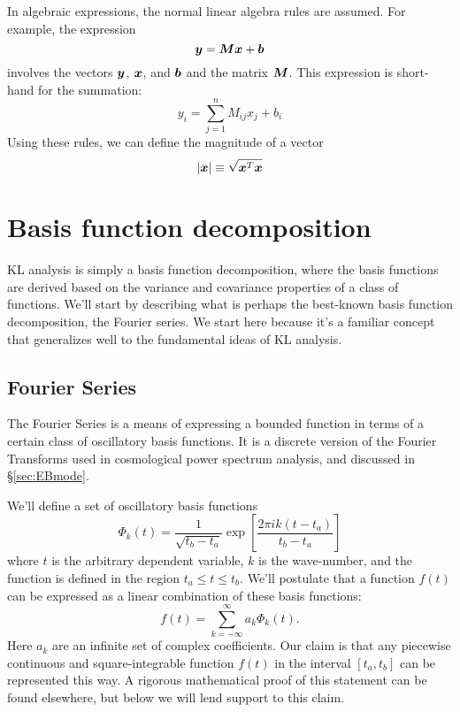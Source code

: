 In algebraic expressions, the normal linear algebra rules are assumed.
For example, the expression 
\begin{equation}
  \boldsymbol{y} = \boldsymbol{M}\boldsymbol{x} + \boldsymbol{b}
\end{equation}
involves the vectors $\boldsymbol{y}$, $\boldsymbol{x}$, and $\boldsymbol{b}$ and the
matrix $\boldsymbol{M}$.  This expression is short-hand for the summation:
\begin{equation}
  y_i = \sum_{j=1}^{n} M_{ij} x_j + b_i
\end{equation}
Using these rules, we can define the magnitude of a vector
\begin{equation}
  |\boldsymbol{x}| \equiv \sqrt{\boldsymbol{x}^T \boldsymbol{x}}
\end{equation}

\section{Basis function decomposition}
KL analysis is simply a basis function decomposition, where the basis
functions are derived based on the variance and covariance properties
of a class of functions.  We'll start by describing what is perhaps the
best-known basis function decomposition, the Fourier series.
We start here because it's a familiar concept that generalizes well to
the fundamental ideas of KL analysis.

\subsection{Fourier Series}
The Fourier Series is a means of expressing a bounded function in terms
of a certain class of oscillatory basis functions.  It is a discrete version
of the Fourier Transforms used in cosmological power spectrum analysis, and
discussed in \S\ref{sec:EBmode}.

We'll define a set of oscillatory basis functions 
\begin{equation}
  \label{eq:fourier_basis}
  \Phi_k(t) = \frac{1}{\sqrt{t_b - t_a}}
  \exp\left[\frac{2\pi i k (t-t_a)}{t_b - t_a}\right]
\end{equation}
where $t$ is the arbitrary dependent variable, $k$ is the wave-number,
and the function is defined in the region $t_a \le t \le t_b$.
We'll postulate that a function $f(t)$ can be expressed as a linear
combination of these basis functions:
\begin{equation}
  \label{eq:fourier_1D}
  f(t) = \sum_{k=-\infty}^\infty a_k\Phi_k(t).
\end{equation}
Here $a_k$ are an infinite set of complex coefficients.  Our claim is that
any piecewise continuous and square-integrable function $f(t)$ in the
interval $[t_a, t_b]$ can be represented this way.
A rigorous mathematical proof
of this statement can be found elsewhere, but below we will lend support
to this claim.

